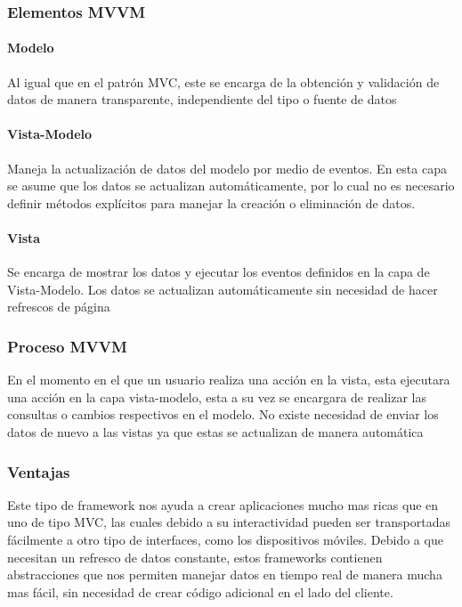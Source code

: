\subsubsection{Elementos MVVM}

\paragraph{Modelo}
Al igual que en el patrón MVC, este se encarga de la obtención y
validación de datos de manera transparente, independiente del
tipo o fuente de datos

\paragraph{Vista-Modelo}
Maneja la actualización de datos del modelo por medio de eventos. En esta capa
se asume que los datos se actualizan automáticamente, por lo cual no es
necesario definir métodos explícitos para manejar la creación o eliminación
de datos.

\paragraph{Vista}
Se encarga de mostrar los datos y ejecutar los eventos definidos en la
capa de Vista-Modelo. Los datos se actualizan automáticamente sin necesidad
de hacer refrescos de página

\subsubsection{Proceso MVVM}
En el momento en el que un usuario realiza una acción en la vista, esta ejecutara
una acción en la capa vista-modelo, esta a su vez se encargara de realizar las
consultas o cambios respectivos en el modelo. No existe necesidad de enviar los
datos de nuevo a las vistas ya que estas se actualizan de manera automática

\subsubsection{Ventajas}
Este tipo de framework nos ayuda a crear aplicaciones mucho mas ricas
que en uno de tipo MVC, las cuales debido a su interactividad pueden
ser transportadas fácilmente a otro tipo de interfaces, como los
dispositivos móviles.
Debido a que necesitan un refresco de datos constante, estos frameworks
contienen abstracciones que nos permiten manejar datos en tiempo real
de manera mucha mas fácil, sin necesidad de crear código adicional en
el lado del cliente.

